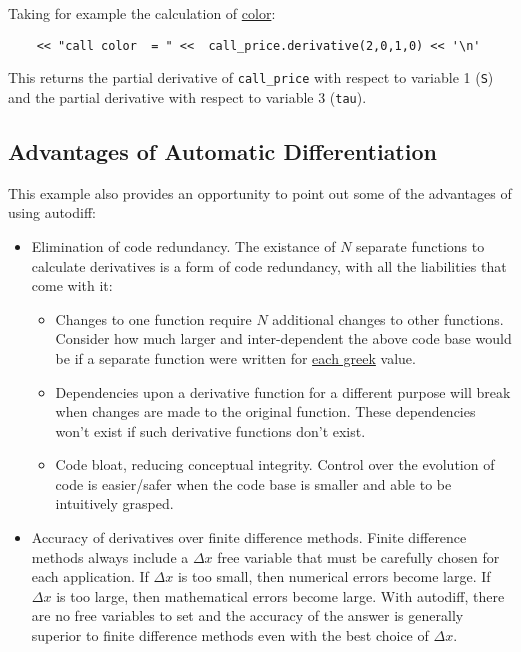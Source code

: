 \documentclass{article}
\begin{document}
Taking for example the calculation of \href{https://en.wikipedia.org/wiki/Greeks_(finance)#Color}{color}:

\begin{verbatim}
    << "call color  = " <<  call_price.derivative(2,0,1,0) << '\n'
\end{verbatim}
This returns the  partial derivative of {\tt call\_price} with respect to variable 1 ({\tt S})
and the  partial derivative with respect to variable 3 ({\tt tau}).

\subsection{Advantages of Automatic Differentiation}
This example also provides an opportunity to point out some of the advantages of using autodiff:
\begin{itemize}
\item Elimination of code redundancy. The existance of $N$ separate functions to calculate derivatives is a form
  of code redundancy, with all the liabilities that come with it:
  \begin{itemize}
    \item Changes to one function require $N$ additional changes to other functions. Consider how much larger
        and inter-dependent the above code base would be if a separate function were written for
        \href{https://en.wikipedia.org/wiki/Greeks_(finance)#Formulas_for_European_option_Greeks}{each greek} value.
    \item Dependencies upon a derivative function for a different purpose will break when changes are made to
        the original function. These dependencies won't exist if such derivative functions don't exist.
    \item Code bloat, reducing conceptual integrity. Control over the evolution of code is easier/safer when
        the code base is smaller and able to be intuitively grasped.
  \end{itemize}
\item Accuracy of derivatives over finite difference methods. Finite difference methods always include a
   $\Delta x$ free variable that must be carefully chosen for each application. If $\Delta x$ is too small, then
   numerical errors become large. If $\Delta x$ is too large, then mathematical errors become large.  With autodiff,
   there are no free variables to set and the accuracy of the answer is generally superior to finite difference
   methods even with the best choice of $\Delta x$.
\end{itemize}
\end{document}
